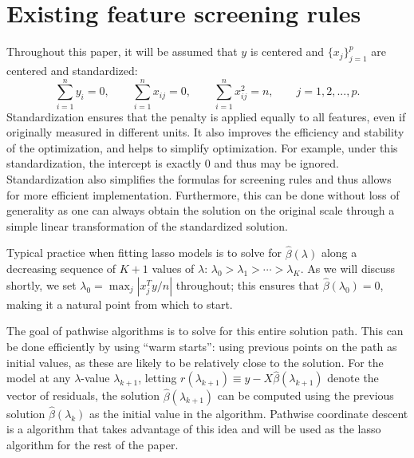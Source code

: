 \section{Existing feature screening rules}
\label{sec:existing}

Throughout this paper, it will be assumed that $y$ is centered and $\{x_j\}_{j=1}^p$ are centered and standardized:
\begin{equation}
  \label{eq:std}
  \sum_{i=1}^ny_i=0, \qquad \sum_{i=1}^n x_{ij}=0, \qquad \sum_{i=1}^n x_{ij}^2=n,\qquad j=1,2,...,p.
\end{equation}
Standardization ensures that the penalty is applied equally to all features, even if originally measured in different units. It also improves the efficiency and stability of the optimization, and helps to simplify optimization.  For example, under this standardization, the intercept is exactly 0 and thus may be ignored.  Standardization also simplifies the formulas for screening rules and thus allows for more efficient implementation.  Furthermore, this can be done without loss of generality as one can always obtain the solution on the original scale through a simple linear transformation of the standardized solution.

Typical practice when fitting lasso models is to solve for $\hat{\beta}(\lambda)$ along a decreasing sequence of $K+1$ values of $\lambda$: $\lambda_0 > \lambda_1 > \cdots > \lambda_K$.  As we will discuss shortly, we set $\lambda_0=\max_j|x_j^Ty/n|$ throughout; this ensures that $\hat{\beta}(\lambda_0)=0$, making it a natural point from which to start.

The goal of pathwise algorithms is to solve for this entire solution path.  This can be done efficiently by using ``warm starts'': using previous points on the path as initial values, as these are likely to be relatively close to the solution.  For the model at any $\lambda$-value $\lambda_{k+1}$, letting $r(\lambda_{k+1}) \equiv y-X\hat{\beta}(\lambda_{k+1})$ denote the vector of residuals, the solution $\hat{\beta}(\lambda_{k+1})$ can be computed using the previous solution $\hat{\beta}(\lambda_k)$ as the initial value in the algorithm. Pathwise coordinate descent is a algorithm that takes advantage of this idea and will be used as the lasso algorithm for the rest of the paper.

